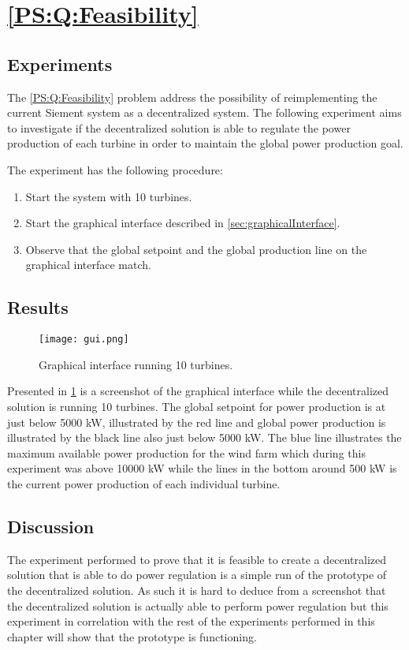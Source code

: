 
\section{\ref{PS:Q:Feasibility}}
\subsection{Experiments}

The \ref{PS:Q:Feasibility} problem address the possibility of reimplementing the current Siement system as a decentralized system. The following experiment aims to investigate if the decentralized solution is able to regulate the power production of each turbine in order to maintain the global power production goal.

The experiment has the following procedure:
\begin{enumerate}
	\item Start the system with 10 turbines.
	\item Start the graphical interface described in \cref{sec:graphicalInterface}.
	\item Observe that the global setpoint and the global production line on the graphical interface match.
\end{enumerate}

\subsection{Results}
\label{sec:exp:feasibility}
\begin{figure} [!h]
	\centering
	\texttt{[image: gui.png]} 
	\caption[Graphical interface running 10 turbines]{
		\label{fig:graphicalInterface} 
		\footnotesize{%
			Graphical interface running 10 turbines.
		}
	}
\end{figure}

Presented in \cref{fig:graphicalInterface} is a screenshot of the graphical interface while the decentralized solution is running 10 turbines.
The global setpoint for power production is at just below 5000 kW, illustrated by the red line and global power production is illustrated by the black line also just below 5000 kW.
The blue line illustrates the maximum available power production for the wind farm which during this experiment was above 10000 kW while the lines in the bottom around 500 kW is the current power production of each individual turbine.

\subsection{Discussion}
The experiment performed to prove that it is feasible to create a decentralized solution that is able to do power regulation is a simple run of the prototype of the decentralized solution. As such it is hard to deduce from a screenshot that the decentralized solution is actually able to perform power regulation but this experiment in correlation with the rest of the experiments performed in this chapter will show that the prototype is functioning.

\clearpage